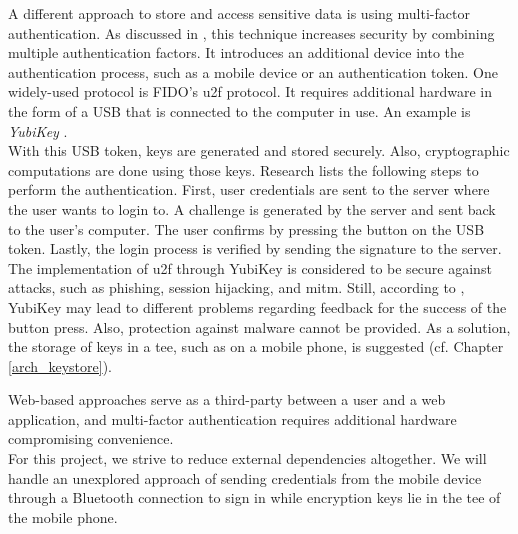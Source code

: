 A different approach to store and access sensitive data is using multi-factor authentication. As discussed in \cite{JacommeK18}, this technique increases security by combining multiple authentication factors. It introduces an additional device into the authentication process, such as a mobile device or an authentication token. One widely-used protocol is FIDO's \gls{u2f} protocol. It requires additional hardware in the form of a USB that is connected to the computer in use. An example is \textit{YubiKey} \cite{Yubikey}. \\
With this USB token, keys are generated and stored securely. Also, cryptographic computations are done using those keys. Research \cite{JacommeK18} lists the following steps to perform the authentication. First, user credentials are sent to the server where the user wants to login to. A challenge is generated by the server and sent back to the user's computer. The user confirms by pressing the button on the USB token. Lastly, the login process is verified by sending the signature to the server. \\
The implementation of \gls{u2f} through YubiKey is considered to be secure against attacks, such as phishing, session hijacking, and \gls{mitm}. Still, according to \cite{JacommeK18}, YubiKey may lead to different problems regarding feedback for the success of the button press. Also, protection against malware cannot be provided. As a solution, the storage of keys in a \gls{tee}, such as on a mobile phone, is suggested (cf. Chapter \ref{arch_keystore}).

Web-based approaches serve as a third-party between a user and a web application, and multi-factor authentication requires additional hardware compromising convenience. \\
For this project, we strive to reduce external dependencies altogether. We will handle an unexplored approach of sending credentials from the mobile device through a Bluetooth connection to sign in while encryption keys lie in the \gls{tee} of the mobile phone.
